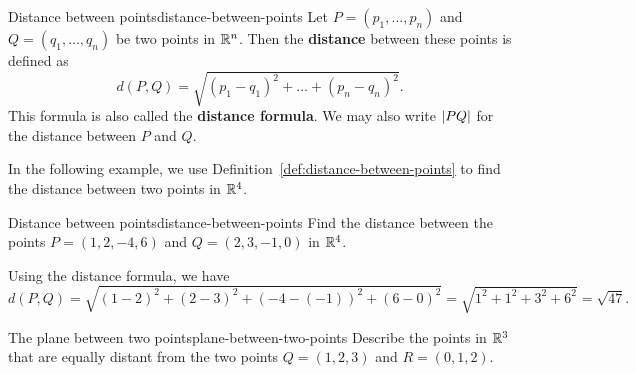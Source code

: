 \begin{definition}{Distance between points}{distance-between-points}
  Let $P=(p_{1},\ldots,p_{n})$ and $Q=(q_{1},\ldots,q_{n})$ be
  two points in $\mathbb{R}^{n}$. Then the
  \textbf{distance}
  between these points is defined as
  \begin{equation*}
    d(P, Q) = \sqrt{(p_1-q_1)^2 + \ldots + (p_n-q_n)^2}.
  \end{equation*}
  This formula is also called the \textbf{distance
    formula}. We may also write $\left|PQ\right|$
  for the distance between $P$ and $Q$.
\end{definition}

In the following example, we use
Definition~\ref{def:distance-between-points} to find the distance
between two points in $\mathbb{R}^4$.

\begin{example}{Distance between points}{distance-between-points}
  Find the distance between the points $P=(1,2,-4,6)$ and
  $Q=(2,3,-1,0)$ in $\mathbb{R}^{4}$.
\end{example}

\begin{solution}
  Using the distance formula, we have
  \begin{equation*}
    d(P,Q)= \sqrt{ (1-2) ^{2}+(2-3)
      ^{2}+(-4-(-1)) ^{2}+(6-0)^{2}} =
    \sqrt{1^2+1^2+3^2+6^2} = \sqrt{47}.
  \end{equation*}
\end{solution}

\begin{example}{The plane between two points}{plane-between-two-points}
  Describe the points in $\mathbb{R}^3$ that are equally distant from the two
  points $Q=(1,2,3) $ and $R=(0,1,2)$.
\end{example}

